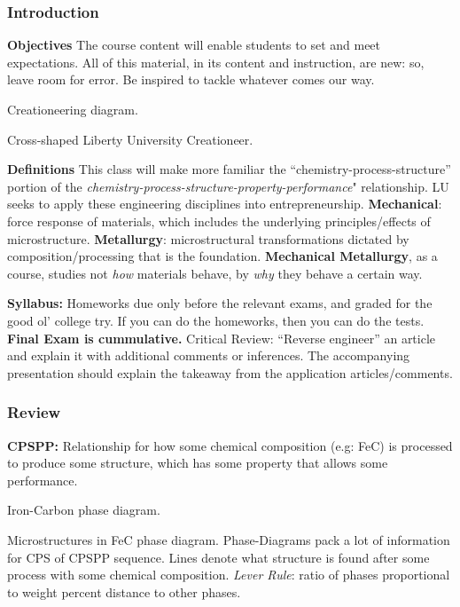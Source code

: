 \documentclass[
]{article}
\begin{document}
\hypertarget{introduction}{%
\subsubsection{Introduction}\label{introduction}}

\textbf{Objectives} The course content will enable students to set and
meet expectations. All of this material, in its content and instruction,
are new: so, leave room for error. Be inspired to tackle whatever comes
our way.

{Creationeering diagram.}

{Cross-shaped Liberty University Creationeer.}

\textbf{Definitions} This class will make more familiar the
``chemistry-process-structure'' portion of the
\textit{chemistry-process-structure-property-performance}" relationship.
LU seeks to apply these engineering disciplines into entrepreneurship.
\textbf{Mechanical}: force response of materials, which includes the
underlying principles/effects of microstructure. \textbf{Metallurgy}:
microstructural transformations dictated by composition/processing that
is the foundation. \textbf{Mechanical Metallurgy}, as a course, studies
not \textit{how} materials behave, by \textit{why} they behave a certain
way.

\textbf{Syllabus:} Homeworks due only before the relevant exams, and
graded for the good ol' college try. If you can do the homeworks, then
you can do the tests. \textbf{Final Exam is cummulative.} Critical
Review: ``Reverse engineer'' an article and explain it with additional
comments or inferences. The accompanying presentation should explain the
takeaway from the application articles/comments.

\hypertarget{review}{%
\subsubsection{Review}\label{review}}

\textbf{\textbf{CPSPP}:} Relationship for how some chemical composition
(e.g: FeC) is processed to produce some structure, which has some
property that allows some performance.

{Iron-Carbon phase diagram.}

{Microstructures in FeC phase diagram. Phase-Diagrams pack a lot of
information for CPS of CPSPP sequence. Lines denote what structure is
found after some process with some chemical composition.
\textit{Lever Rule}: ratio of phases proportional to weight percent
distance to other phases.}
\end{document}
